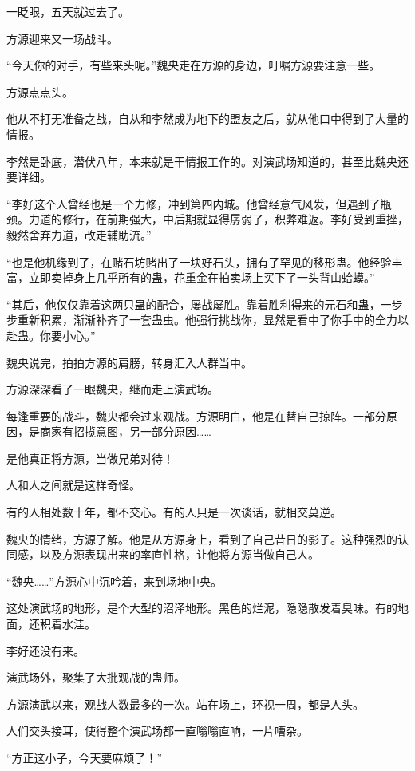 
\begin{this_body}

一眨眼，五天就过去了。

方源迎来又一场战斗。

“今天你的对手，有些来头呢。”魏央走在方源的身边，叮嘱方源要注意一些。

方源点点头。

他从不打无准备之战，自从和李然成为地下的盟友之后，就从他口中得到了大量的情报。

李然是卧底，潜伏八年，本来就是干情报工作的。对演武场知道的，甚至比魏央还要详细。

“李好这个人曾经也是一个力修，冲到第四内城。他曾经意气风发，但遇到了瓶颈。力道的修行，在前期强大，中后期就显得孱弱了，积弊难返。李好受到重挫，毅然舍弃力道，改走辅助流。”

“也是他机缘到了，在赌石坊赌出了一块好石头，拥有了罕见的移形蛊。他经验丰富，立即卖掉身上几乎所有的蛊，花重金在拍卖场上买下了一头背山蛤蟆。”

“其后，他仅仅靠着这两只蛊的配合，屡战屡胜。靠着胜利得来的元石和蛊，一步步重新积累，渐渐补齐了一套蛊虫。他强行挑战你，显然是看中了你手中的全力以赴蛊。你要小心。”

魏央说完，拍拍方源的肩膀，转身汇入人群当中。

方源深深看了一眼魏央，继而走上演武场。

每逢重要的战斗，魏央都会过来观战。方源明白，他是在替自己掠阵。一部分原因，是商家有招揽意图，另一部分原因……

是他真正将方源，当做兄弟对待！

人和人之间就是这样奇怪。

有的人相处数十年，都不交心。有的人只是一次谈话，就相交莫逆。

魏央的情绪，方源了解。他是从方源身上，看到了自己昔日的影子。这种强烈的认同感，以及方源表现出来的率直性格，让他将方源当做自己人。

“魏央……”方源心中沉吟着，来到场地中央。

这处演武场的地形，是个大型的沼泽地形。黑色的烂泥，隐隐散发着臭味。有的地面，还积着水洼。

李好还没有来。

演武场外，聚集了大批观战的蛊师。

方源演武以来，观战人数最多的一次。站在场上，环视一周，都是人头。

人们交头接耳，使得整个演武场都一直嗡嗡直响，一片嘈杂。

“方正这小子，今天要麻烦了！”


\end{this_body}
